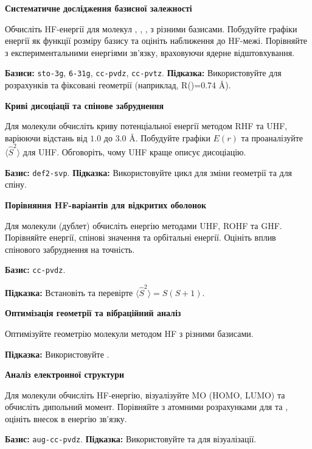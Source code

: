\begin{tasks}

\item \textbf{Систематичне дослідження базисної залежності}

Обчисліть HF-енергії для молекул , , ,  з різними базисами. Побудуйте графіки енергії як функції розміру базису та оцініть наближення до HF-межі. Порівняйте з експериментальними енергіями зв'язку, враховуючи ядерне відштовхування.

\textbf{Базиси:} \texttt{sto-3g}, \texttt{6-31g}, \texttt{cc-pvdz}, \texttt{cc-pvtz}. \textbf{Підказка:} Використовуйте  для розрахунків та фіксовані геометрії (наприклад, R()=0.74 \AA).

\item \textbf{Криві дисоціації та спінове забруднення}

Для молекули  обчисліть криву потенціальної енергії методом RHF та UHF, варіюючи відстань від $1.0$ до $3.0$ \AA. Побудуйте графіки $E(r)$ та проаналізуйте $\langle \hat{S}^2 \rangle$ для UHF. Обговоріть, чому UHF краще описує дисоціацію.

\textbf{Базис:} \texttt{def2-svp}. \textbf{Підказка:} Використовуйте цикл для зміни геометрії та  для спіну.

\item \textbf{Порівняння HF-варіантів для відкритих оболонок}

Для молекули  (дублет) обчисліть енергію методами UHF, ROHF та GHF. Порівняйте енергії, спінові значення та орбітальні енергії. Оцініть вплив спінового забруднення на точність.

\textbf{Базис:} \texttt{cc-pvdz}.

\textbf{Підказка:} Встановіть  та перевірте $\langle \hat{S}^2 \rangle = S(S+1)$.

\item \textbf{Оптимізація геометрії та вібраційний аналіз}

Оптимізуйте геометрію молекули  методом HF з різними базисами.

\textbf{Підказка:} Використовуйте .

\item \textbf{Аналіз електронної структури}

Для молекули  обчисліть HF-енергію, візуалізуйте MO (HOMO, LUMO) та обчисліть дипольний момент. Порівняйте з атомними розрахунками для  та , оцініть внесок в енергію зв'язку.

\textbf{Базис:} \texttt{aug-cc-pvdz}. \textbf{Підказка:} Використовуйте  та  для візуалізації.

\end{tasks}





